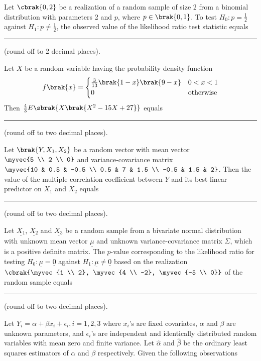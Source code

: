 \item Let $\cbrak{0, 2}$ be a realization of a random sample of size 2 from a binomial distribution
with parameters 2 and $p$, where $p \in \brak{0, 1}$. To test $H_0: p = \frac{1}{2}$ against
$H_1: p \ne \frac{1}{2}$, the observed value of the likelihood ratio test statistic equals
\rule{1.0cm}{0.15mm} (round off to 2 decimal places).

\item Let $X$ be a random variable having the probability density function
\begin{align*}
    f\brak{x} = 
    \begin{cases}
        \frac{3}{13}\brak{1-x}\brak{9-x} & 0 < x < 1 \\
        0 & \text{otherwise}
    \end{cases}
\end{align*}
Then $\frac{4}{3}E\sbrak{X\brak{X^2 - 15X + 27}}$ equals \rule{1.0cm}{0.15mm}
(round off to two decimal places).

\item Let $\brak{Y, X_1, X_2}$ be a random vector with mean vector $\myvec{5 \\ 2 \\ 0}$ and
variance-covariance matrix $\myvec{10 & 0.5 & -0.5 \\ 0.5 & 7 & 1.5 \\ -0.5 & 1.5 & 2}$.
Then the value of the multiple correlation coefficient between $Y$ and its best linear predictor on $X_1$
and $X_2$ equals \rule{1.0cm}{0.15mm} (round off to two decimal places).

\item Let $\underline{X_1}$, $\underline{X_2}$ and $\underline{X_3}$ be a random sample from a bivariate
normal distribution with unknown mean vector $\underline{\mu}$ and unknown variance-covariance matrix
$\Sigma$, which is a positive definite matrix. The $p$-value corresponding to the likelihood ratio for testing
$H_0: \underline{\mu} = \underline{0}$ against $H_1: \underline{\mu} \ne \underline{0}$ based on the realization
$\cbrak{\myvec{1 \\ 2}, \myvec{4 \\ -2}, \myvec{-5 \\ 0}}$ of the random sample equals \rule{1.0cm}{0.15mm}
(round off to two decimal places).

\item Let $Y_i = \alpha + \beta x_i + \epsilon_i, i=1,2,3$ where $x_i$'s are fixed covariates,
$\alpha$ and $\beta$ are unknown parameters, and $\epsilon_i$'s are independent and identically
distributed random variables with mean zero and finite variance. Let $\hat \alpha$ and
$\hat \beta$ be the ordinary least squares estimators of $\alpha$ and $\beta$ respectively. Given
the following observations

